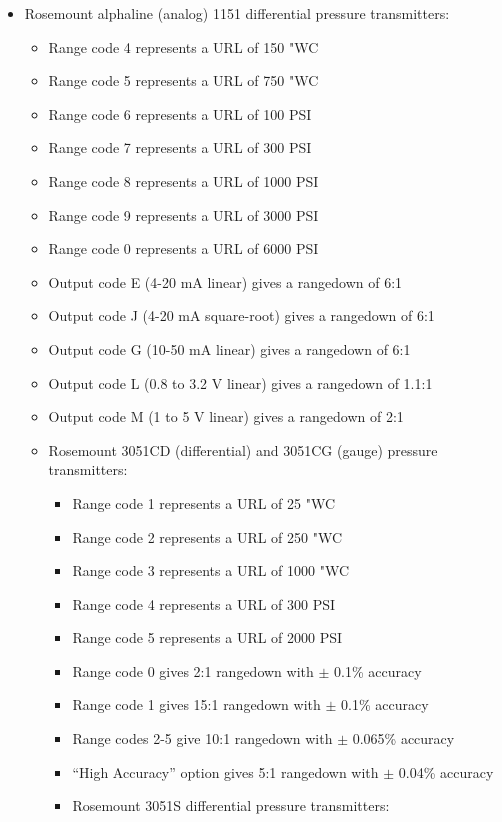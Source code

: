 \begin{itemize}
\item{} Rosemount alphaline (analog) 1151 differential pressure transmitters:
\begin{itemize}

\item{} Range code 4 represents a URL of 150 "WC
\item{} Range code 5 represents a URL of 750 "WC
\item{} Range code 6 represents a URL of 100 PSI
\item{} Range code 7 represents a URL of 300 PSI
\item{} Range code 8 represents a URL of 1000 PSI
\item{} Range code 9 represents a URL of 3000 PSI
\item{} Range code 0 represents a URL of 6000 PSI
\item{} Output code E (4-20 mA linear) gives a rangedown of 6:1
\item{} Output code J (4-20 mA square-root) gives a rangedown of 6:1
\item{} Output code G (10-50 mA linear) gives a rangedown of 6:1
\item{} Output code L (0.8 to 3.2 V linear) gives a rangedown of 1.1:1
\item{} Output code M (1 to 5 V linear) gives a rangedown of 2:1
\vskip 5pt
\item{} Rosemount 3051CD (differential) and 3051CG (gauge) pressure transmitters:
\begin{itemize}

\item{} Range code 1 represents a URL of 25 "WC
\item{} Range code 2 represents a URL of 250 "WC
\item{} Range code 3 represents a URL of 1000 "WC
\item{} Range code 4 represents a URL of 300 PSI
\item{} Range code 5 represents a URL of 2000 PSI
\item{} Range code 0 gives 2:1 rangedown with $\pm$ 0.1\% accuracy
\item{} Range code 1 gives 15:1 rangedown with $\pm$ 0.1\% accuracy
\item{} Range codes 2-5 give 10:1 rangedown with $\pm$ 0.065\% accuracy
\item{} ``High Accuracy'' option gives 5:1 rangedown with $\pm$ 0.04\% accuracy
\vskip 5pt
\item{} Rosemount 3051S differential pressure transmitters:
\begin{itemize}


\end{itemize}
\end{itemize}
\end{itemize}
\end{itemize}
